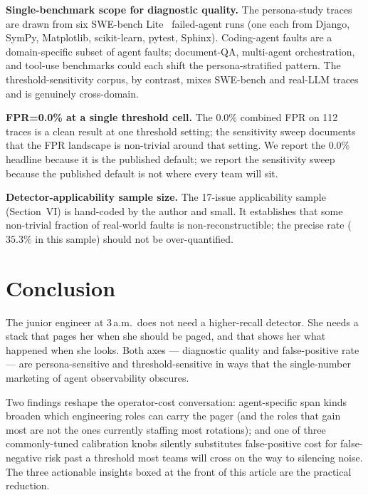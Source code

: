 \documentclass[journal]{IEEEtran}
\begin{document}
\textbf{Single-benchmark scope for diagnostic quality.} The persona-study traces are drawn from six SWE-bench Lite~\cite{swebench} failed-agent runs (one each from Django, SymPy, Matplotlib, scikit-learn, pytest, Sphinx). Coding-agent faults are a domain-specific subset of agent faults; document-QA, multi-agent orchestration, and tool-use benchmarks could each shift the persona-stratified pattern. The threshold-sensitivity corpus, by contrast, mixes SWE-bench and real-LLM traces and is genuinely cross-domain.

\textbf{FPR=0.0\% at a single threshold cell.} The 0.0\% combined FPR on 112 traces is a clean result at one threshold setting; the sensitivity sweep documents that the FPR landscape is non-trivial around that setting. We report the 0.0\% headline because it is the published default; we report the sensitivity sweep because the published default is not where every team will sit.

\textbf{Detector-applicability sample size.} The 17-issue applicability sample (Section~VI) is hand-coded by the author and small. It establishes that some non-trivial fraction of real-world faults is non-reconstructible; the precise rate ($35.3\%$ in this sample) should not be over-quantified.

\section{Conclusion}

The junior engineer at 3\,a.m.\ does not need a higher-recall detector. She needs a stack that pages her when she should be paged, and that shows her what happened when she looks. Both axes --- diagnostic quality and false-positive rate --- are persona-sensitive and threshold-sensitive in ways that the single-number marketing of agent observability obscures.

Two findings reshape the operator-cost conversation: agent-specific span kinds broaden which engineering roles can carry the pager (and the roles that gain most are not the ones currently staffing most rotations); and one of three commonly-tuned calibration knobs silently substitutes false-positive cost for false-negative risk past a threshold most teams will cross on the way to silencing noise. The three actionable insights boxed at the front of this article are the practical reduction.
\end{document}
